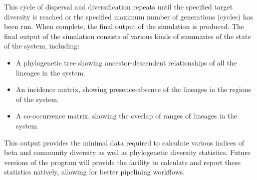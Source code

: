 \documentclass[11pt]{article}
\begin{document}
This cycle of dispersal and diversification repeats until the specified target diversity is reached or the specified maximum number of generations (cycles) has been run.
When complete, the final output of the simulation is produced.
The final output of the simulation consists of various kinds of summaries of the state of the system, including:

\begin{itemize}
	\item A phylogenetic tree showing ancestor-descendent relationships of all the lineages in the system.
	\item An incidence matrix, showing presence-absence of the lineages in the regions of the system.
	\item A co-occurrence matrix, showing the overlap of ranges of lineages in the system.
\end{itemize}

This output provides the minimal data required to calculate various indices of beta and community diversity as well as phylogenetic diversity statistics.
Future versions of the program will provide the facility to calculate and report these statistics natively, allowing for better pipelining workflows.


\end{document}
